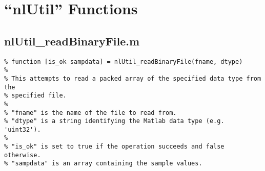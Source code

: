 \chapter{``nlUtil'' Functions}
\label{sect-util}

\section{nlUtil\_readBinaryFile.m}

\begin{verbatim}
% function [is_ok sampdata] = nlUtil_readBinaryFile(fname, dtype)
%
% This attempts to read a packed array of the specified data type from the
% specified file.
%
% "fname" is the name of the file to read from.
% "dtype" is a string identifying the Matlab data type (e.g. 'uint32').
%
% "is_ok" is set to true if the operation succeeds and false otherwise.
% "sampdata" is an array containing the sample values.
\end{verbatim}

